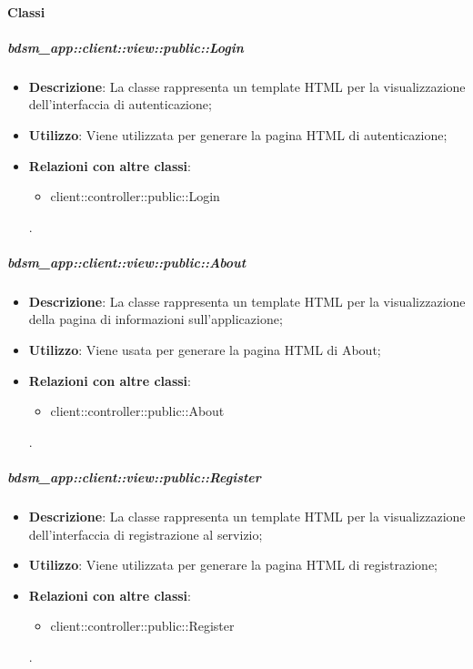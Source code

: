 	\paragraph{Classi} %
		\subparagraph{bdsm\_app::client::view::public::Login} %
		\label{subp:bdsm_app_client_view_public_login}
			\begin{itemize}
				\item \textbf{Descrizione}: La classe rappresenta un template HTML per la visualizzazione dell'interfaccia di autenticazione;
				\item \textbf{Utilizzo}: Viene utilizzata per generare la pagina HTML di autenticazione;
				\item \textbf{Relazioni con altre classi}: 		
					\begin{itemize}
						\item client::controller::public::Login
					\end{itemize}.
			\end{itemize}

		\subparagraph{bdsm\_app::client::view::public::About} %
		\label{subp:bdsm_app_client_view_public_about}
			\begin{itemize}
				\item \textbf{Descrizione}: La classe rappresenta un template HTML per la visualizzazione della pagina di informazioni sull'applicazione;
				\item \textbf{Utilizzo}: Viene usata per generare la pagina HTML di About;
				\item \textbf{Relazioni con altre classi}: 		
					\begin{itemize}
						\item client::controller::public::About
					\end{itemize}.
			\end{itemize}

		\subparagraph{bdsm\_app::client::view::public::Register} %
		\label{subp:bdsm_app_client_view_public_register}
			\begin{itemize}
				\item \textbf{Descrizione}: La classe rappresenta un template HTML per la visualizzazione dell'interfaccia di registrazione al servizio;
				\item \textbf{Utilizzo}: Viene utilizzata per generare la pagina HTML di registrazione;
				\item \textbf{Relazioni con altre classi}: 		
					\begin{itemize}
						\item client::controller::public::Register
					\end{itemize}.
			\end{itemize}

